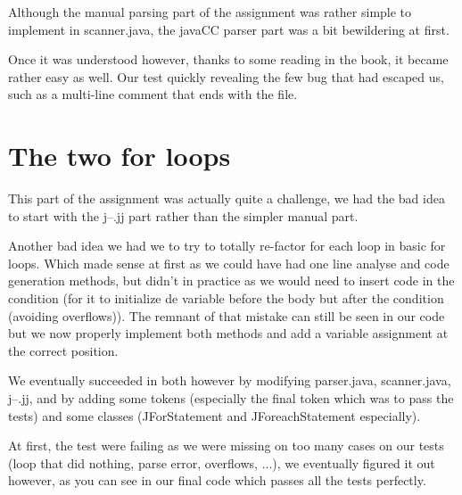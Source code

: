 \documentclass[a4paper, 11pt]{article}
\begin{document}
		Although the manual parsing part of the assignment was rather simple to
		implement in scanner.java, the javaCC parser part was a bit bewildering at first.
		\newline
		
		Once it was understood however, thanks to some reading in the book, it became
		rather easy as well. Our test quickly revealing the few bug that had escaped us,
		such as a multi-line comment that ends with the file.
		
	\section{The two for loops}
	
		This part of the assignment was actually quite a challenge, we had the bad idea
		to start with the j--.jj part rather than the simpler manual part.\newline

		Another bad idea we had we to try to totally re-factor for each loop in
		basic for loops. Which made sense at first as we could have had one line analyse
		and code generation methods, but didn't in practice as we would need to 
		insert code in the condition (for it to  initialize de variable before the body but
		after the condition (avoiding overflows)). The remnant of that
		mistake can still be seen in our code but we now properly implement
		both methods and add a variable assignment at the correct position.\newline
		
		We eventually succeeded in both however by modifying parser.java, scanner.java,
		 j--.jj, and by adding some tokens (especially the final token which was 
		 to pass the tests) and
		 some classes (JForStatement and JForeachStatement especially).\newline
		 
		At first, the test were failing as we were missing on too many cases on our
		tests (loop that did nothing, parse error, overflows, ...), we eventually 
		figured it out however, as you can see in our final code which passes all
		the tests perfectly.
		
		
		
\end{document}
